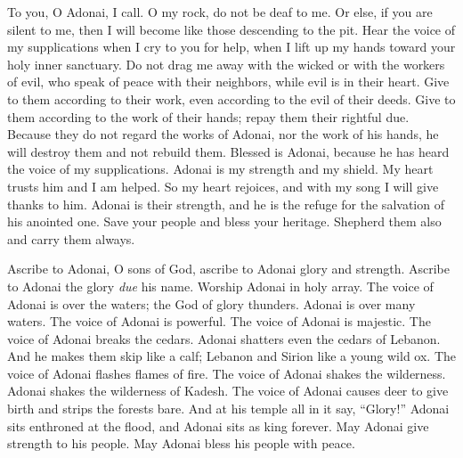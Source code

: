 \begin{biblechapter} %
 To you, O Adonai, I call. 
O my rock, do not be deaf to me. 
Or else, if you are silent to me, 
then I will become like those descending to the pit.
\verse Hear the voice of my supplications 
when I cry to you for help, 
when I lift up my hands 
toward your holy inner sanctuary.
\verse Do not drag me away with the wicked 
or with the workers of evil, 
who speak of peace with their neighbors, 
while evil is in their heart.
\verse Give to them according to their work, 
even according to the evil of their deeds. 
Give to them according to the work of their hands; 
repay them their rightful due.
\verse Because they do not regard the works of Adonai, 
nor the work of his hands, 
he will destroy them 
and not rebuild them.
\verse Blessed is Adonai, 
because he has heard the voice of my supplications.
\verse Adonai is my strength and my shield. 
My heart trusts him and I am helped. 
So my heart rejoices, 
and with my song I will give thanks to him.
\verse Adonai is their strength, 
and he is the refuge for the salvation of his anointed one.
\verse Save your people 
and bless your heritage. 
Shepherd them also and carry them always.
\end{biblechapter}

\begin{biblechapter} %
 Ascribe to Adonai, O sons of God, 
ascribe to Adonai glory and strength.
\verse Ascribe to Adonai the glory \textit{due} his name. 
Worship Adonai in holy array.
\verse The voice of Adonai is over the waters; 
the God of glory thunders. 
Adonai is over many waters.
\verse The voice of Adonai is powerful. 
The voice of Adonai is majestic.
\verse The voice of Adonai breaks the cedars. 
Adonai shatters even the cedars of Lebanon.
\verse And he makes them skip like a calf; 
Lebanon and Sirion like a young wild ox.
\verse The voice of Adonai flashes flames of fire.
\verse The voice of Adonai shakes the wilderness. 
Adonai shakes the wilderness of Kadesh.
\verse The voice of Adonai causes deer to give birth 
and strips the forests bare. 
And at his temple all in it say, “Glory!”
\verse Adonai sits enthroned at the flood, 
and Adonai sits as king forever.
\verse May Adonai give strength to his people. 
May Adonai bless his people with peace.
\end{biblechapter}

